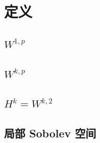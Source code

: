 \section{定义}
\label{b1:sec:2101}


\subsection{\texorpdfstring{\(W^{1,p}\)}{W1,p}}
\label{b1:subsec:210101}

\subsection{\texorpdfstring{\(W^{k,p}\)}{Wk,p}}
\label{b1:subsec:210102}

\subsection{\texorpdfstring{\(H^k=W^{k,2}\)}{Hk=Wk,2}}
\label{b1:subsec:210103}

\subsection{局部 Sobolev 空间}
\label{b1:subsec:210104}


